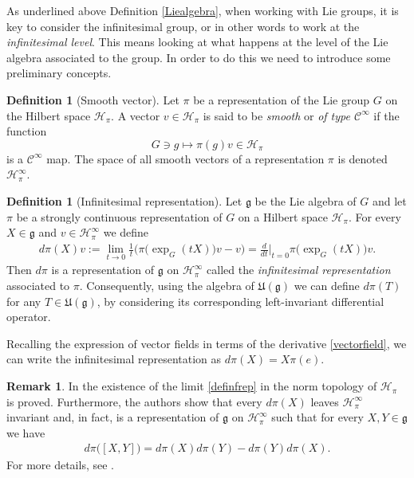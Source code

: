 \documentclass[12pt,oneside,a4paper]{book}
\numberwithin{equation}{section}     %
\theoremstyle{plain}
\theoremstyle{definition}
\newtheorem{definition}[theorem]{Definition}
\newtheorem{remark}[theorem]{Remark}
\begin{document}
\indent As underlined above Definition \ref{Liealgebra}, when working with Lie groups, it is key to consider the infinitesimal group, or in other words to work at the \textit{infinitesimal level}. This means looking at what happens at the level of the Lie algebra associated to the group. In order to do this we need to introduce some preliminary concepts.

\begin{definition}[Smooth vector]
	Let $\pi$ be a representation of the Lie group $G$ on the Hilbert space $\mathcal H_\pi$. A vector $v\in\mathcal H_\pi$ is said to be \textit{smooth} or \textit{of type $\mathcal C^\infty$} if the function 
	\[
	G\ni g\mapsto \pi(g)v\in\mathcal H_\pi
	\]
	is a $\mathcal C^\infty$ map. The space of all smooth vectors of a representation $\pi$ is denoted $\mathcal H_\pi^\infty$.
\end{definition}

\begin{definition}[Infinitesimal representation]
	Let $\mathfrak g $ be the Lie algebra of $G$ and let $\pi$ be a strongly continuous representation of $G$ on a Hilbert space $\mathcal H_\pi$. For every $X\in\mathfrak g$ and $v\in\mathcal H_\pi^\infty$ we define 
	\begin{align}\label{definfrep}
	d\pi(X)v:=\lim_{t\rightarrow 0}\frac{1}{t}\Big(\pi\big(\exp_G(tX)\big)v-v\Big)=\frac{d}{dt}\Bigr|_{t=0}\pi\big(\exp_{G}(tX)\big)v.
	\end{align}
	Then $d\pi$ is a representation of $\mathfrak g$ on $\mathcal H_\pi^\infty$ called the \textit{infinitesimal representation} associated to $\pi$. Consequently, using the algebra of $\mathfrak{U}(\mathfrak{g})$ we can define  $d\pi(T)$ for any $T\in\mathfrak{U}(\mathfrak{g})$, by considering its corresponding left-invariant differential operator.
\end{definition}
Recalling the expression of vector fields in terms of the derivative \eqref{vectorfield}, we can write the infinitesimal representation as $d\pi(X)=X\pi(e)$.
\begin{remark}
	In \cite[Proposition 1.7.3]{FR2016} the existence of the limit \eqref{definfrep} in the norm topology of $\mathcal{H}_\pi$ is proved. Furthermore, the authors show that every $d\pi(X)$ leaves $\mathcal H_\pi^\infty$ invariant and, in fact, is a representation of $\mathfrak{g}$ on $\mathcal H_\pi^\infty$ such that for every $X,Y\in\mathfrak{g}$ we have
	\begin{align*}
	d\pi\big([X,Y]\big)=d\pi(X)d\pi(Y)-d\pi(Y)d\pi(X).
	\end{align*}
	For more details, see \cite[Chapter 4]{CG90}.
\end{remark}
\end{document}
